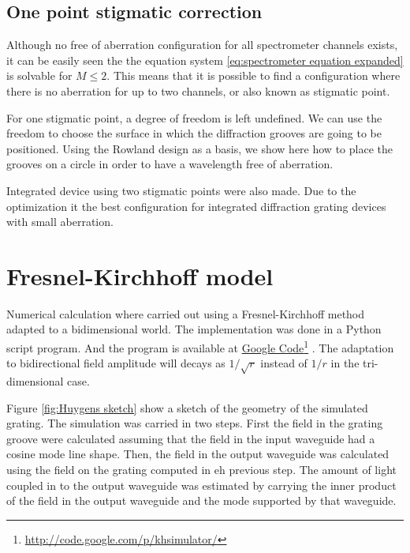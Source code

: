 \documentclass[12pt,twoside,english]{book}
\renewcommand{\~}{\perispomeni}%
\numberwithin{equation}{section}
\numberwithin{figure}{section}
\newcommand\fnurl[2]{%
 \href{#2}{#1}\footnote{\url{#2}}%
}
\begin{document}
\subsection{One point stigmatic correction}
Although no free of aberration configuration for all spectrometer channels exists, it can be easily seen the the equation system \ref{eq:spectrometer equation expanded} is solvable for $M\le2$. This means that it is possible to find a configuration where there is no aberration for up to two channels, or also known as stigmatic point.

For one stigmatic point, a degree of freedom is left undefined. We can use the freedom to choose the surface in which the diffraction grooves are going to be positioned\cite{McGreer:1996p15}. Using the Rowland design as a basis, we show here how to place the grooves on a circle in order to have a wavelength free of aberration. 

Integrated device using two stigmatic points were also made\cite{Horst:2009p1764,Gidon:1988p1765}. Due to the optimization it the best configuration for integrated diffraction grating devices with small aberration.


\section{Fresnel-Kirchhoff model}
\label{section:Rayleigh-Huygens-model}

Numerical calculation where carried out using a Fresnel-Kirchhoff method adapted to a bidimensional world\cite{Brouckaert:2007p82}. The implementation was done in a Python script program. And the program is available at \fnurl{Google Code}{http://code.google.com/p/khsimulator/}. The adaptation to bidirectional field amplitude will decays as $1/\sqrt{r}$ instead of $1/r$ in the tri-dimensional case.

Figure \ref{fig:Huygens sketch} show a sketch of the geometry of the simulated grating. The simulation was carried in two steps. First the field in the grating groove were calculated assuming that the field in the input waveguide had a cosine mode line shape. Then, the field in the output waveguide was calculated using the field on the grating computed in eh previous step. The amount of light coupled in to the output waveguide was estimated by carrying the inner product of the field in the output waveguide and the mode supported by that waveguide.
\end{document}
